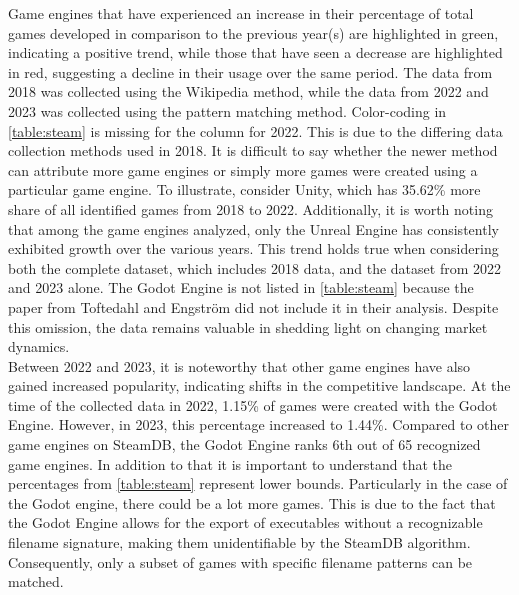 Game engines that have experienced an increase in their percentage of total games developed in comparison to the previous year(s) are highlighted in green, indicating a positive trend, while those that have seen a decrease are highlighted in red, suggesting a decline in their usage over the same period.
The data from 2018 was collected using the Wikipedia method, while the data from 2022 and 2023 was collected using the pattern matching method.
Color-coding in \autoref{table:steam} is missing for the column for 2022.
This is due to the differing data collection methods used in 2018.
It is difficult to say whether the newer method can attribute more game engines or simply more games were created using a particular game engine.
To illustrate, consider Unity, which has 35.62\% more share of all identified games from 2018 to 2022.
Additionally, it is worth noting that among the game engines analyzed, only the Unreal Engine has consistently exhibited growth over the various years.
This trend holds true when considering both the complete dataset, which includes 2018 data, and the dataset from 2022 and 2023 alone.
The Godot Engine is not listed in \autoref{table:steam} because the paper from Toftedahl and Engström did not include it in their analysis.
Despite this omission, the data remains valuable in shedding light on changing market dynamics. \\

Between 2022 and 2023, it is noteworthy that other game engines have also gained increased popularity, indicating shifts in the competitive landscape.
At the time of the collected data in 2022, 1.15\% of games were created with the Godot Engine.
However, in 2023, this percentage increased to 1.44\%.
Compared to other game engines on SteamDB, the Godot Engine ranks 6th out of 65 recognized game engines.
In addition to that it is important to understand that the percentages from \autoref{table:steam} represent lower bounds.
Particularly in the case of the Godot engine, there could be a lot more games.
This is due to the fact that the Godot Engine allows for the export of executables without a recognizable filename signature, making them unidentifiable by the SteamDB algorithm.
Consequently, only a subset of games with specific filename patterns can be matched. \\

